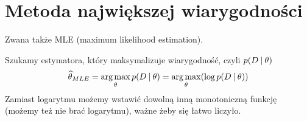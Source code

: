 \section{Metoda największej wiarygodności}

Zwana także MLE (maximum likelihood estimation).

Szukamy estymatora, który maksymalizuje wiarygodność, czyli \( p(D \:\vert\: \theta) \)
\[
    \mle{\theta} = \argmax_{\theta} p(D \given \theta) = \argmax_{\theta} \pars{\log p(D \given \theta)}
\]
Zamiast logarytmu możemy wstawić dowolną inną monotoniczną funkcję (możemy też nie brać logarytmu), ważne żeby się łatwo liczyło.